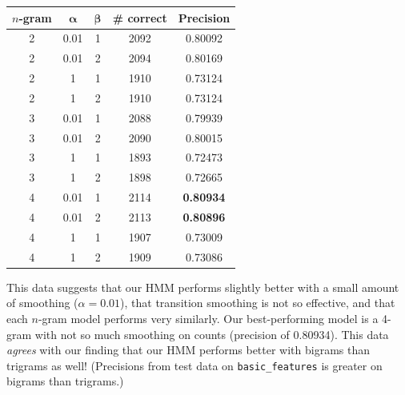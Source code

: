 \documentclass{article}
\begin{document}
{\small\begin{tabular}{|c|c|c|c|c|}\hline
$n$-gram & $\bm{\alpha}$ & $\bm{\beta}$ & \# correct & Precision\\\hline
2 & 0.01 & 1 & 2092 & 0.80092\\
2 & 0.01 & 2 & 2094 & 0.80169\\
2 & 1    & 1 & 1910 & 0.73124\\
2 & 1    & 2 & 1910 & 0.73124\\
3 & 0.01 & 1 & 2088 & 0.79939\\
3 & 0.01 & 2 & 2090 & 0.80015\\
3 & 1    & 1 & 1893 & 0.72473\\
3 & 1    & 2 & 1898 & 0.72665\\
4 & 0.01 & 1 & 2114 & \textbf{0.80934}\\
4 & 0.01 & 2 & 2113 & \textbf{0.80896}\\
4 & 1    & 1 & 1907 & 0.73009\\
4 & 1    & 2 & 1909 & 0.73086\\\hline
\end{tabular}}\par\medskip

This data suggests that our HMM performs slightly better with a small amount of smoothing ($\alpha = 0.01$), that transition smoothing is not so effective, and that each $n$-gram model performs very similarly. Our best-performing model is a 4-gram with not so much smoothing on counts (precision of 0.80934). This data \emph{agrees} with our finding that our HMM performs better with bigrams than trigrams as well! (Precisions from test data on \texttt{basic\_features} is greater on bigrams than trigrams.)
\end{document}

